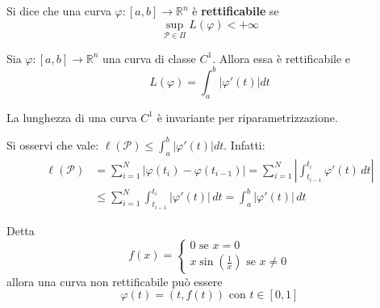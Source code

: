 \begin{definition}
    Si dice che una curva $\varphi: [a,b] \to \mathbb{R}^n$ è \textbf{rettificabile} se 
    \begin{equation}
        \sup\limits_{\mathcal{P}\in\Pi}L(\varphi)<+\infty
    \end{equation}
\end{definition}
\begin{theorem}
Sia $\varphi: [a,b] \to \mathbb{R}^n$ una curva di classe $C^1$. Allora essa è rettificabile e 
\begin{equation}
    L(\varphi)=\int_{a}^{b}{|\varphi'(t)|dt}
\end{equation}
\end{theorem}
\begin{oss}
    La lunghezza di una curva $C^1$ è invariante per riparametrizzazione.
\end{oss}
\begin{oss}
    Si osservi che vale: $\ell(\mathcal{P})\leq \int_{a}^{b}{|\varphi'(t)|dt}$. Infatti:
    \begin{equation}
        \begin{aligned}
            \ell(\mathcal{P}) &= \sum\limits_{i=1}^{N} \left| \varphi(t_i) - \varphi(t_{i-1}) \right|= \sum\limits_{i=1}^{N} \left\lvert \int_{t_{i-1}}^{t_i} \varphi'(t) \, dt \right\rvert \\
            &\leq \sum\limits_{i=1}^{N} \int_{t_{i-1}}^{t_i} \left\lvert \varphi'(t) \right\rvert \, dt = \int_{a}^{b} \left\lvert \varphi'(t) \right\rvert \, dt
        \end{aligned}
    \end{equation}
\end{oss}
\begin{example}
    Detta 
    \begin{equation*}
        f(x)= \begin{cases}
            0 \text{ se } x=0\\ x\sin(\frac{1}{x}) \text{ se } x\neq 0
        \end{cases}
    \end{equation*}
    allora una curva non rettificabile può essere 
    \begin{equation*}
        \varphi(t)=(t, f(t)) \text{ con } t\in[0,1]
    \end{equation*}
\end{example}
